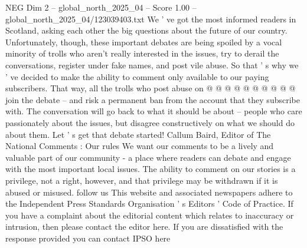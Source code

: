 \begin{textsample}{NEG Dim 2 – global\_north\_2025\_04 – Score 1.00 – global\_north\_2025\_04/123039403.txt}
We ' ve got the most informed readers in Scotland, asking each other the big questions about the future of our country.
Unfortunately, though, these important debates are being spoiled by a vocal minority of trolls who aren't really interested in the issues, try to derail the conversations, register under fake names, and post vile abuse.
So that ' s why we ' ve decided to make the ability to comment only available to our paying subscribers.
That way, all the trolls who post abuse on @ @ @ @ @ @ @ @ @ @ join the debate -- and risk a permanent ban from the account that they subscribe with.
The conversation will go back to what it should be about -- people who care passionately about the issues, but disagree constructively on what we should do about them.
Let ' s get that debate started!
Callum Baird, Editor of The National Comments : Our rules We want our comments to be a lively and valuable part of our community - a place where readers can debate and engage with the most important local issues.
The ability to comment on our stories is a privilege, not a right, however, and that privilege may be withdrawn if it is abused or misused. follow us This website and associated newspapers adhere to the Independent Press Standards Organisation ' s Editors ' Code of Practice.
If you have a complaint about the editorial content which relates to inaccuracy or intrusion, then please contact the editor here.
If you are dissatisfied with the response provided you can contact IPSO here

\end{textsample}
